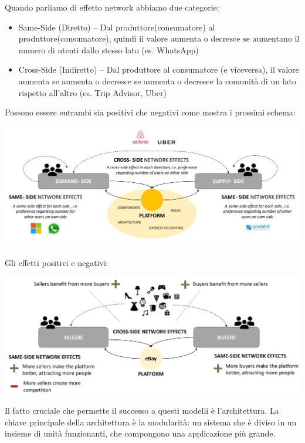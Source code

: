 \documentclass[a4page, 11pt]{article}
\begin{document}
Quando parliamo di effetto network abbiamo due categorie:

\begin{itemize}
	 
	\item
	Same-Side (Diretto) -- Dal produttore(consumatore) al
	produttore(consumatore), quindi il valore aumenta o decresce se
	aumentano il numero di utenti dallo stesso lato (es. WhatsApp)
	\item
	Cross-Side (Indiretto) -- Dal produttore al consumatore (e viceversa),
	il valore aumenta se aumenta o decresce se aumenta o decresce la
	comunità di un lato rispetto all'altro (es. Trip Advisor, Uber)
\end{itemize}

Possono essere entrambi sia positivi che negativi come mostra i prossimi
schema:
\begin{center}
	\includegraphics[scale=0.35]{image5.png}
\end{center}
Gli effetti positivi e negativi: \newline
\begin{center}
	\includegraphics[scale=0.35]{image6.png}
\end{center}



Il fatto cruciale che permette il successo a questi modelli è
l'architettura. La chiave principale della architettura è la modularità:
un sistema che è diviso in un insieme di unità funzionanti, che
compongono una applicazione più grande.
\end{document}
